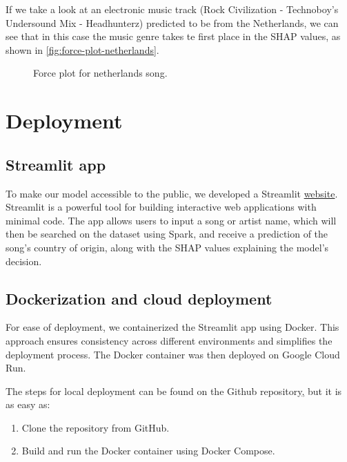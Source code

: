 \documentclass{article}
\begin{document}
If we take a look at an electronic music track (Rock Civilization - Technoboy's Undersound Mix - Headhunterz) predicted to be from the Netherlands, we can see that in this case the music genre takes te first place in the SHAP values, as shown in \autoref{fig:force-plot-netherlands}.\newline

\begin{figure}[H]
    \centering
    \noindent
    \caption{Force plot for netherlands song.}
    \label{fig:force-plot-netherlands}
\end{figure}

\section{Deployment}

\subsection{Streamlit app}
To make our model accessible to the public, we developed a Streamlit \href{https://songmap.xyz}{website}. Streamlit is a powerful tool for building interactive web applications with minimal code. The app allows users to input a song or artist name, which will then be searched on the dataset using Spark, and receive a prediction of the song's country of origin, along with the SHAP values explaining the model's decision.

\subsection{Dockerization and cloud deployment}
For ease of deployment, we containerized the Streamlit app using Docker. This approach ensures consistency across different environments and simplifies the deployment process. The Docker container was then deployed on Google Cloud Run.

The steps for local deployment can be found on the {Github repository}\href{https://github.com/FerranAD/songmap}, but it is as easy as:
\begin{enumerate}
    \item Clone the repository from GitHub.
    \item Build and run the Docker container using Docker Compose.
\end{enumerate}
\end{document}
